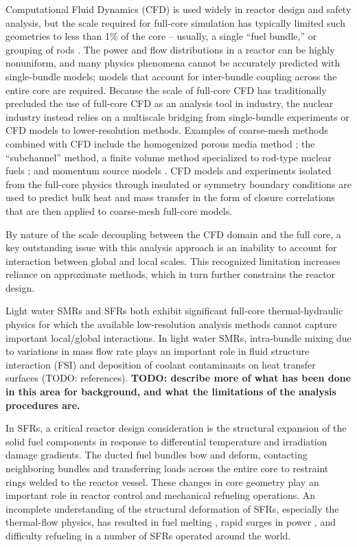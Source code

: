 Computational Fluid Dynamics (CFD) is used widely in reactor design and safety
analysis, but the scale required for full-core simulation has typically limited
such geometries to less than 1\% of the core -- usually, a single ``fuel
bundle,'' or grouping of rods \cite{wang2020,fanning,wang2020b}. The power and
flow distributions in a reactor can be highly nonuniform, and many physics
phenomena cannot be accurately predicted with single-bundle models; models that
account for inter-bundle coupling across the entire core are required.
Because the scale of full-core CFD has traditionally precluded the use of
full-core CFD as an analysis tool in industry, the nuclear industry instead
relies on a multiscale bridging from single-bundle experiments or CFD models to
lower-resolution methods. Examples of coarse-mesh methods combined with CFD
include the homogenized porous media method \cite{wang2020c}; the
``subchannel'' method, a finite volume method specialized to rod-type nuclear
fuels \cite{blyth}; and momentum source models \cite{hu2013}. CFD models and
experiments isolated from the full-core physics through insulated or symmetry
boundary conditions are used to predict bulk heat and mass transfer in the form
of closure correlations that are then applied to coarse-mesh full-core models.

By nature of the scale decoupling between the CFD domain and the full core, a
key outstanding issue with this analysis approach is an inability to account
for interaction between global and local scales. This recognized limitation
increases reliance on approximate methods, which in turn further constrains the
reactor design.

Light water SMRs and SFRs both exhibit significant full-core thermal-hydraulic
physics for which the available low-resolution analysis methods cannot capture
important local/global interactions. In light water SMRs, intra-bundle mixing
due to variations in mass flow rate plays an important role in fluid structure
interaction (FSI) and deposition of coolant contaminants on heat transfer
surfaces (TODO: references). {\bf TODO: describe more of what has been done in
this area for background, and what the limitations of the analysis procedures
are.}

In SFRs, a critical reactor design consideration is the structural expansion of
the solid fuel components in response to differential temperature and
irradiation damage gradients. The ducted fuel bundles bow and deform,
contacting neighboring bundles and transferring loads across the entire core to
restraint rings welded to the reactor vessel. These changes in core geometry
play an important role in reactor control and mechanical refueling operations.
An incomplete understanding of the structural deformation of SFRs, especially
the thermal-flow physics, has resulted in fuel melting \cite{brittan}, rapid
surges in power \cite{chaumont}, and difficulty refueling \cite{shields} in a
number of SFRs operated around the world.

